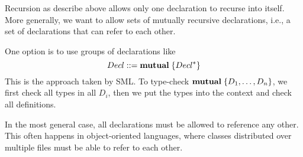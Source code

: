 Recursion as describe above allows only one declaration to recurse into itself.
More generally, we want to allow sets of mutually recursive declarations, i.e., a set of declarations that can refer to each other.

One option is to use groups of declarations like
\[Decl ::= {\rm \bf mutual}\;\{Decl^*\}\]
This is the approach taken by SML.
To type-check ${\rm \bf mutual}\;\{D_1,\ldots,D_n\}$, we first check all types in all $D_i$, then we put the types into the context and check all definitions.

In the most general case, all declarations must be allowed to reference any other.
This often happens in object-oriented languages, where classes distributed over multiple files must be able to refer to each other.
